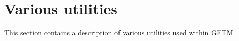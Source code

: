 \section{Various utilities}

This section contains a description of various utilities used within GETM.

\vspace{0.5cm}

